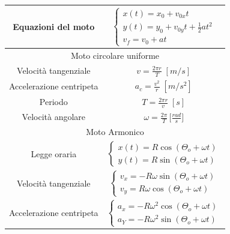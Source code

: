 \begin{tabular}{|c|c|}
        \hline Equazioni del moto &
            $
                \begin{cases}
                    x(t) = x_0 + v_{0x}t \\
                    y(t) = y_0 + v_{0y}t + \frac{1}{2}at^2\\
                    v_{f} = v_{0} + at
                \end{cases}
            $
            \\
    \hline

    \multicolumn{2}{|c|}{Moto circolare uniforme} \\

        \hline Velocità tangenziale &
            $
                v = \frac{2\pi r}{T} \; [m/s]
            $
            \\

        \hline Accelerazione centripeta &
            $
                a_c = \frac{v^2}{r} \; [m/s^2]
            $
            \\

        \hline Periodo &
            $
                T = \frac{2\pi r}{v} \; [s]
            $
            \\

        \hline Velocità angolare &
            $
                \omega = \frac{2\pi}{T} \, \Bigg[\frac{rad}{s} \Bigg]
            $
            \\
    \hline

    \multicolumn{2}{|c|}{Moto Armonico} \\

        \hline Legge oraria &
            $
                \begin{cases}
                    x(t)=R\cos{(\Theta_o+\omega t)} \\
                    y(t)=R\sin{(\Theta_o+\omega t)}
                \end{cases}
            $
            \\

        \hline Velocità tangenziale &
            $
                \begin{cases}
                    v_x=-R\omega\sin{(\Theta_o+\omega t)} \\
                    v_y=R\omega\cos{(\Theta_o+\omega t)}
                \end{cases}
            $
            \\

        \hline Accelerazione centripeta &
            $
                \begin{cases}
                    a_x=-R\omega^2\cos{(\Theta_o+\omega t)} \\
                    a_Y=-R\omega^2\sin{(\Theta_o+\omega t)}
                \end{cases}
            $
            \\
    \hline


\end{tabular}
